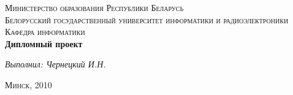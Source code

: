 \begin{titlepage}
  \begin{center}
    \textsc{\Large Министерство образования Республики Беларусь}\\[1cm]
    \textsc{\LARGE Белорусский государственный университет информатики и радиоэлектроники}\\[1.5cm]
    \textsc{\Large Кафедра информатики}\\[4.5cm]
    \textbf{\Huge Дипломный проект}\\[4cm]
    \begin{minipage}{\textwidth}
      \begin{flushright}
        \textit{\Large Выполнил: Чернецкий И.Н.}
      \end{flushright}
    \end{minipage}
    \vfill
    \textsc{\Large Минск, 2010}
  \end{center}
\end{titlepage}
